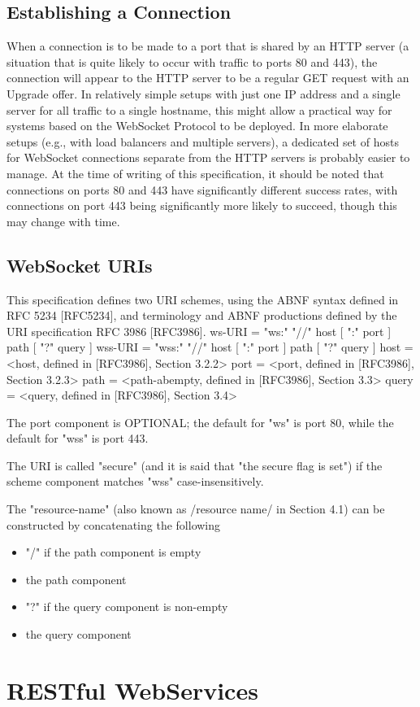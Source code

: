 \subsection{Establishing a Connection}
When a connection is to be made to a port that is shared by an HTTP
server (a situation that is quite likely to occur with traffic to
ports 80 and 443), the connection will appear to the HTTP server to
be a regular GET request with an Upgrade offer.  In relatively simple
setups with just one IP address and a single server for all traffic
to a single hostname, this might allow a practical way for systems
based on the WebSocket Protocol to be deployed.  In more elaborate
setups (e.g., with load balancers and multiple servers), a dedicated
set of hosts for WebSocket connections separate from the HTTP servers
is probably easier to manage.  At the time of writing of this
specification, it should be noted that connections on ports 80 and
443 have significantly different success rates, with connections on
port 443 being significantly more likely to succeed, though this may
change with time.

\subsection{WebSocket URIs}
This specification defines two URI schemes, using the ABNF syntax
defined in RFC 5234 [RFC5234], and terminology and ABNF productions
defined by the URI specification RFC 3986 [RFC3986].
\newline
ws-URI = "ws:" "//" host [ ":" port ] path [ "?" query ]\newline
wss-URI = "wss:" "//" host [ ":" port ] path [ "?" query ]\newline
\newline
host = <host, defined in [RFC3986], Section 3.2.2>\newline
port = <port, defined in [RFC3986], Section 3.2.3>\newline
path = <path-abempty, defined in [RFC3986], Section 3.3>\newline
query = <query, defined in [RFC3986], Section 3.4>\newline

The port component is OPTIONAL; the default for "ws" is port 80,
while the default for "wss" is port 443.

The URI is called "secure" (and it is said that "the secure flag is
set") if the scheme component matches "wss" case-insensitively.

The "resource-name" (also known as /resource name/ in Section 4.1)
can be constructed by concatenating the following
\begin{itemize}
\item "/" if the path component is empty
\item the path component
\item "?" if the query component is non-empty
\item the query component
\end{itemize}

\section{RESTful WebServices}
